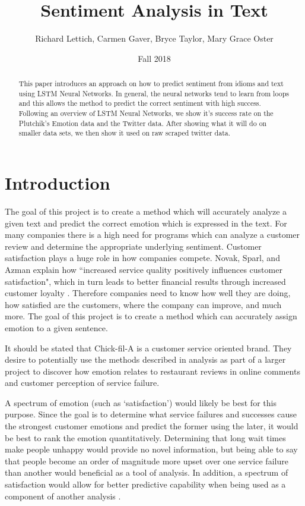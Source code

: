 \documentclass[titlepage,letterpaper]{article}
\title{Sentiment Analysis in Text}
\author{Richard Lettich, Carmen Gaver, Bryce Taylor, Mary Grace Oster}
\date{Fall 2018}
\begin{document}
\maketitle

\begin{abstract}
This paper introduces an approach on how to predict sentiment from idioms and text using LSTM Neural Networks. In general, the neural networks tend to learn from loops and this allows the method to predict the correct sentiment with high success. Following an overview of LSTM Neural Networks, we show it's success rate on the Plutchik's Emotion data and the Twitter data. After showing what it will do on smaller data sets, we then show it used on raw scraped twitter data. \\
\end{abstract}

\section{Introduction}

The goal of this project is to create a method which will accurately analyze a given text and predict the correct emotion which is expressed in the text. For many companies there is a high need for programs which can analyze a customer review and determine the appropriate underlying sentiment. Customer satisfaction plays a huge role in how companies compete. Novak, Sparl, and Azman explain how ``increased service quality positively influences customer satisfaction", which in turn leads to better financial results through increased customer loyalty \cite{BusinessCustomerSatisfaction}. Therefore companies need to know how well they are doing, how satisfied are the customers, where the company can improve, and much more. The goal of this project is to create a method which can accurately assign emotion to a given sentence.

It should be stated that Chick-fil-A is a customer service oriented brand. They desire to potentially use the methods described in analysis as part of a larger project to discover how emotion relates to restaurant reviews in online comments and customer perception of service failure.

A spectrum of emotion (such as `satisfaction') would likely be best for this purpose. Since the goal is to determine what service failures and successes cause the strongest customer emotions and predict the former using the later, it would be best to rank the emotion quantitatively. Determining that long wait times make people unhappy would provide no novel information, but being able to say that people become an order of magnitude more upset over one service failure than another would beneficial as a tool of analysis. In addition, a spectrum of satisfaction would allow for better predictive capability when being used as a component of another analysis \cite{lowriwilliams}.
\end{document}
